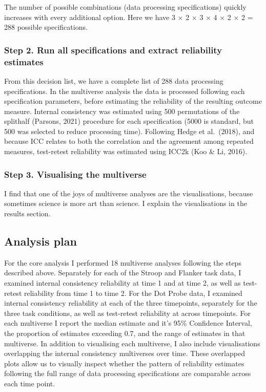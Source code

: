 \documentclass[
  english,
  man,floatsintext]{apa6}
\begin{document}
The number of possible combinations (data processing specifications) quickly increases with every additional option. Here we have 3 \(\times\) 2 \(\times\) 3 \(\times\) 4 \(\times\) 2 \(\times\) 2 = 288 possible specifications.

\hypertarget{step-2.-run-all-specifications-and-extract-reliability-estimates}{%
\subsubsection{Step 2. Run all specifications and extract reliability estimates}\label{step-2.-run-all-specifications-and-extract-reliability-estimates}}

From this decision list, we have a complete list of 288 data processing specifications. In the multiverse analysis the data is processed following each specification parameters, before estimating the reliability of the resulting outcome measure. Internal consistency was estimated using 500 permutations of the splithalf (Parsons, 2021) procedure for each specification (5000 is standard, but 500 was selected to reduce processing time). Following Hedge et al.~(2018), and because ICC relates to both the correlation and the agreement among repeated measures, test-retest reliability was estimated using ICC2k (Koo \& Li, 2016).

\hypertarget{step-3.-visualising-the-multiverse}{%
\subsubsection{Step 3. Visualising the multiverse}\label{step-3.-visualising-the-multiverse}}

I find that one of the joys of multiverse analyses are the visualisations, because sometimes science is more art than science. I explain the visualisations in the results section.

\hypertarget{analysis-plan}{%
\subsection{Analysis plan}\label{analysis-plan}}

For the core analysis I performed 18 multiverse analyses following the steps described above. Separately for each of the Stroop and Flanker task data, I examined internal consistency reliability at time 1 and at time 2, as well as test-retest reliability from time 1 to time 2. For the Dot Probe data, I examined internal consistency reliability at each of the three timepoints, separately for the three task conditions, as well as test-retest reliability at across timepoints. For each multiverse I report the median estimate and it's 95\% Confidence Interval, the proportion of estimates exceeding 0.7, and the range of estimates in that multiverse. In addition to visualising each multiverse, I also include visualisations overlapping the internal consistency multiverses over time. These overlapped plots allow us to visually inspect whether the pattern of reliability estimates following the full range of data processing specifications are comparable across each time point.
\end{document}
